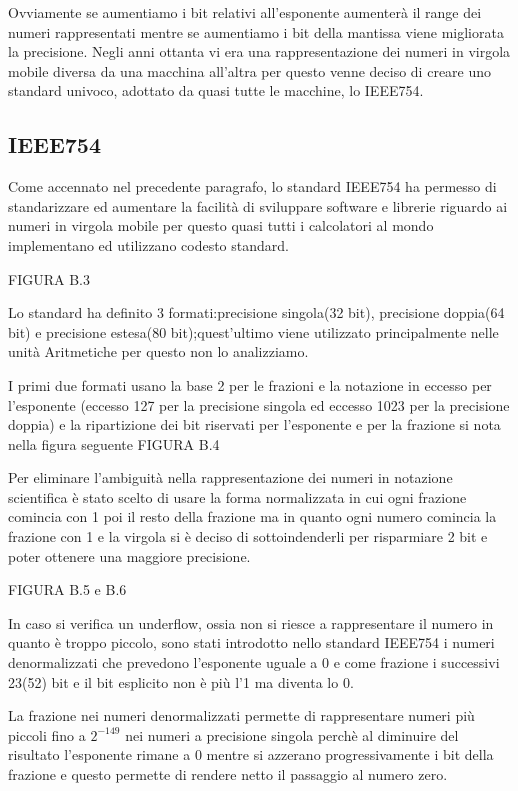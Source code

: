 \begin{description}
        Ovviamente se aumentiamo i bit relativi all'esponente aumenterà il range
        dei numeri rappresentati mentre se aumentiamo i bit della mantissa viene
        migliorata la precisione.
        Negli anni ottanta vi era una rappresentazione dei numeri in virgola mobile
        diversa da una macchina all'altra per questo venne deciso di creare uno standard
        univoco, adottato da quasi tutte le macchine, lo IEEE754.
\end{description}
\subsection{IEEE754}
Come accennato nel precedente paragrafo, lo standard IEEE754 ha permesso di standarizzare
ed aumentare la facilità di sviluppare software e librerie riguardo ai numeri in virgola mobile
per questo quasi tutti i calcolatori al mondo implementano ed utilizzano codesto standard.

FIGURA B.3

Lo standard ha definito 3 formati:precisione singola(32 bit), precisione doppia(64 bit)
e precisione estesa(80 bit);quest'ultimo viene utilizzato principalmente nelle unità Aritmetiche
per questo non lo analizziamo.

I primi due formati usano la base 2 per le frazioni e la notazione in eccesso per l'esponente
(eccesso 127 per la precisione singola ed eccesso 1023 per la precisione doppia)
e la ripartizione dei bit riservati per l'esponente e per la frazione si nota nella
figura seguente
FIGURA B.4

Per eliminare l'ambiguità nella rappresentazione dei numeri in notazione scientifica
è stato scelto di usare la forma normalizzata in cui ogni frazione comincia con 1
poi il resto della frazione ma in quanto ogni numero comincia la frazione con 1 e la
virgola si è deciso di sottoindenderli per risparmiare 2 bit e poter ottenere una maggiore precisione.

FIGURA B.5 e B.6

In caso si verifica un underflow, ossia non si riesce a rappresentare il numero in
quanto è troppo piccolo, sono stati introdotto nello standard IEEE754 i numeri denormalizzati
che prevedono l'esponente uguale a 0 e come frazione i successivi 23(52) bit e il bit
esplicito non è più l'1 ma diventa lo 0.

La frazione nei numeri denormalizzati permette di rappresentare numeri più piccoli
fino a $2^{-149}$ nei numeri a precisione singola perchè al diminuire del risultato
l'esponente rimane a 0 mentre si azzerano progressivamente i bit della frazione
e questo permette di rendere netto il passaggio al numero zero.

